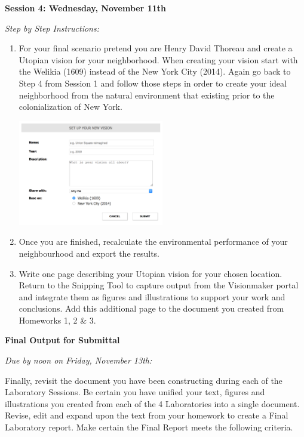 \documentclass{article}
\begin{document}
\large{\textbf{Session 4: Wednesday, November 11th}}

\vspace{4mm}
\setlength{\leftskip}{1cm}
\textit{Step by Step Instructions:}

\begin{enumerate}[leftmargin=15mm]

\item For your final scenario pretend you are Henry David Thoreau and create a Utopian vision for your neighborhood.  When creating your vision start with the Welikia (1609) instead of the New York City (2014).  Again go back to Step 4 from Session 1 and follow those steps in order to create your ideal neighborhood from the natural environment that existing prior to the colonialization of New York.

\includegraphics[width=0.5\textwidth]{old_nyc.png}

\item Once you are finished, recalculate the environmental performance of your neighbourhood and export the results.

\item Write one page describing your Utopian vision for your chosen location.  Return to the Snipping Tool to capture output from the Visionmaker portal and integrate them as figures and illustrations to support your work and conclusions.  Add this additional page to the document you created from Homeworks 1, 2 \& 3.

\end{enumerate}


\setlength{\leftskip}{0cm}

\large{\textbf{Final Output for Submittal}}

\vspace{4mm}
\setlength{\leftskip}{1cm}
\textit{Due by noon on Friday, November 13th:}
\vspace{2mm}

Finally, revisit the document you have been constructing during each of the Laboratory Sessions.  Be certain you have unified your text, figures and illustrations you created from each of the 4 Laboratories into a single document. Revise, edit and expand upon the text from your homework to create a Final Laboratory report.  Make certain the Final Report meets the following criteria.
\end{document}
